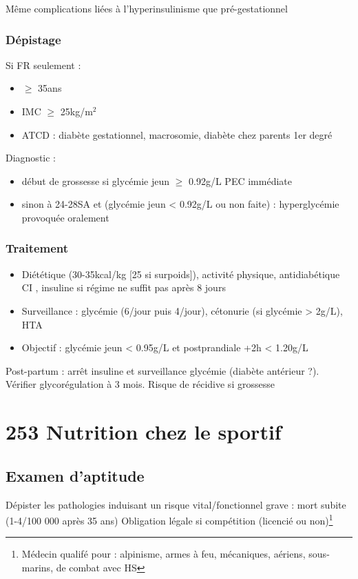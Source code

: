 \documentclass{book}
\begin{document}
Même complications liées à l'hyperinsulinisme que pré-gestationnel

\subsubsection{Dépistage}
\label{sec:org01553fa}
Si FR seulement : 
\begin{itemize}
\item \(\ge\) 35ans
\item IMC \(\ge\) 25kg/m\(^{\text{2}}\)
\item ATCD : diabète gestationnel, macrosomie, diabète chez parents 1er degré
\end{itemize}
Diagnostic :
\begin{itemize}
\item début de grossesse si glycémie jeun \(\ge\) 0.92g/L \thus PEC immédiate
\item sinon à 24-28SA et (glycémie jeun < 0.92g/L ou non faite) : hyperglycémie
provoquée oralement
\end{itemize}

\subsubsection{Traitement}
\label{sec:org7843242}
\begin{itemize}
\item Diététique (30-35kcal/kg [25 si surpoids]), activité physique, antidiabétique
CI \faBomb, insuline si régime ne suffit pas après 8 jours
\item Surveillance : glycémie (6/jour puis 4/jour), cétonurie (si glycémie > 2g/L),
HTA
\item Objectif : glycémie jeun < 0.95g/L et postprandiale +2h < 1.20g/L
\end{itemize}

Post-partum : arrêt insuline et surveillance glycémie (diabète antérieur
?). Vérifier glycorégulation à 3 mois. Risque de récidive si grossesse
\section{253 \textdagger{} Nutrition chez le sportif}
\label{sec:org4c4c823}
\subsection{Examen d'aptitude}
\label{sec:orgcdb360c}
Dépister les pathologies induisant un risque vital/fonctionnel grave : mort
subite (1-4/100 000 après 35 ans)
Obligation légale si compétition (licencié ou non)\footnote{Médecin qualifé pour : alpinisme, armes à feu, mécaniques, aériens, sous-marins, de combat
avec HS}
\end{document}
